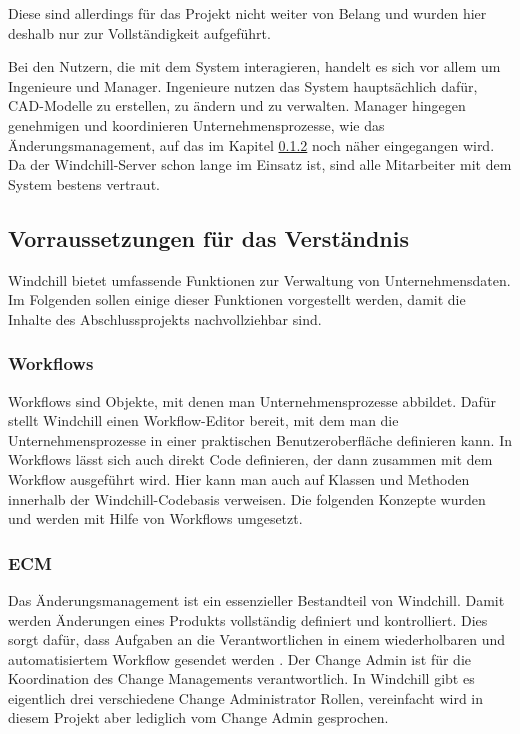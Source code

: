 Diese sind allerdings für das Projekt nicht weiter von Belang und wurden hier deshalb nur zur Vollständigkeit aufgeführt.

Bei den Nutzern, die mit dem System interagieren, handelt es sich vor allem um Ingenieure und Manager.
Ingenieure nutzen das System hauptsächlich dafür, CAD-Modelle zu erstellen, zu ändern und zu verwalten.
Manager hingegen genehmigen und koordinieren Unternehmensprozesse, wie \zB das Änderungsmanagement, auf das im Kapitel \ref{sec:ECM} noch näher eingegangen wird.
Da der Windchill-Server schon lange im Einsatz ist, sind alle Mitarbeiter mit dem System bestens vertraut.

\subsection{Vorraussetzungen für das Verständnis}

Windchill bietet umfassende Funktionen zur Verwaltung von Unternehmensdaten.
Im Folgenden sollen einige dieser Funktionen vorgestellt werden, damit die Inhalte des Abschlussprojekts nachvollziehbar sind.

\subsubsection{Workflows}
Workflows sind Objekte, mit denen man Unternehmensprozesse abbildet.
Dafür stellt Windchill einen Workflow-Editor bereit, mit dem man die Unternehmensprozesse in einer praktischen Benutzeroberfläche definieren kann.
In Workflows lässt sich auch direkt Code definieren, der dann zusammen mit dem Workflow ausgeführt wird.
Hier kann man auch auf Klassen und Methoden innerhalb der Windchill-Codebasis verweisen.
Die folgenden Konzepte wurden und werden mit Hilfe von Workflows umgesetzt.

\subsubsection{\acl{ECM}}
\label{sec:ECM}
Das Änderungsmanagement ist ein essenzieller Bestandteil von Windchill.
Damit werden \glqq Änderungen eines Produkts vollständig definiert und kontrolliert.
Dies sorgt dafür, dass Aufgaben an die Verantwortlichen in einem wiederholbaren und automatisiertem Workflow gesendet werden \grqq{} \cite{WindchillChangeManagement2}.
Der Change Admin ist für die Koordination des Change Managements verantwortlich.
In Windchill gibt es eigentlich drei verschiedene Change Administrator Rollen, vereinfacht wird in diesem Projekt aber lediglich vom Change Admin gesprochen.

